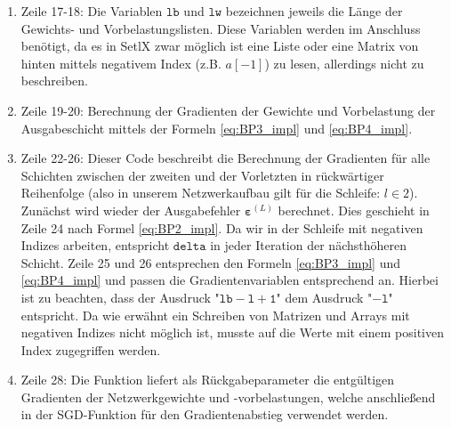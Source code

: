 \begin{enumerate}
\item Zeile 17-18: Die Variablen $\mathtt{lb}$ und $\mathtt{lw}$ bezeichnen jeweils die Länge der Gewichts- und Vorbelastungslisten. Diese Variablen werden im Anschluss benötigt, da es in SetlX zwar möglich ist eine Liste oder eine Matrix von hinten mittels negativem Index (z.B. $a[-1]$) zu lesen, allerdings nicht zu beschreiben.
\item Zeile 19-20: Berechnung der Gradienten der Gewichte und Vorbelastung der Ausgabeschicht mittels der Formeln \eqref{eq:BP3_impl} und \eqref{eq:BP4_impl}.
\item Zeile 22-26: Dieser Code beschreibt die Berechnung der Gradienten für alle Schichten zwischen der zweiten und der Vorletzten in rückwärtiger Reihenfolge (also in unserem Netzwerkaufbau gilt für die Schleife: $l \in {2}$). Zunächst wird wieder der Ausgabefehler $\boldsymbol{\varepsilon}^{(L)}$ berechnet. Dies geschieht in Zeile 24 nach Formel \eqref{eq:BP2_impl}. Da wir in der Schleife mit negativen Indizes arbeiten, entspricht $\mathtt{delta}$ in jeder Iteration der nächsthöheren Schicht. Zeile 25 und 26 entsprechen den Formeln \eqref{eq:BP3_impl} und \eqref{eq:BP4_impl} und passen die Gradientenvariablen entsprechend an. Hierbei ist zu beachten, dass der Ausdruck "$\mathtt{lb-l+1}$" dem Ausdruck "$\mathtt{-l}$" entspricht. Da wie erwähnt ein Schreiben von Matrizen und Arrays mit negativen Indizes nicht möglich ist, musste auf die Werte mit einem positiven Index zugegriffen werden.
\item Zeile 28: Die Funktion liefert als Rückgabeparameter die entgültigen Gradienten der Netzwerkgewichte und -vorbelastungen, welche anschließend in der SGD-Funktion für den Gradientenabstieg verwendet werden.
\end{enumerate}


